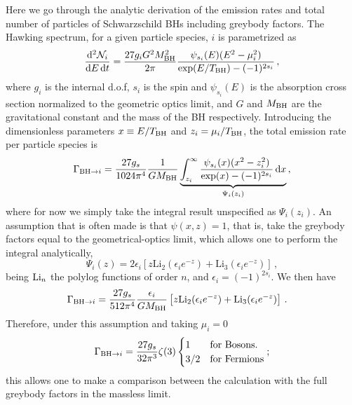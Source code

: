 \documentclass[aps,prd,reprint,twocolumn,preprintnumbers,floatfix,nofootinbib]{revtex4-1}
\newcommand{\TBH}{T_{\rm BH}}
\newcommand{\MBH}{M_{\rm BH}}
\begin{document}
Here we go through the analytic derivation of the emission rates and total number of particles of Schwarzschild BHs including greybody factors. The Hawking spectrum, for a given particle species, $i$ is parametrized as
\begin{equation}
    \frac{\dd[2]{\mathcal N_i}}{\dd{E}\dd{t}} = \frac{27g_i G^2\MBH^2}{2\pi}\frac{\psi_{s_i}(E)(E^2-\mu_i^2)}{\exp(E/\TBH)-(-1)^{2s_i}}\,,
\end{equation}
where $g_i$ is the internal d.o.f, $s_i$ is the spin and $\psi_{s_i}(E)$ is the absorption cross section normalized to the geometric optics limit, and $G$ and $\MBH$ are the gravitational constant and the mass of the BH respectively. Introducing the dimensionless parameters $x\equiv E/\TBH$ and $z_i=\mu_i/\TBH$, the total emission rate per particle species is
\begin{equation}\label{eq:GamSBH}
    \Gamma_{{\rm BH} \to i}=  \frac{27 g_s}{1024\pi^4}\frac{1}{G\MBH} \underbrace{\int_{z_i}^\infty \frac{\psi_{s_i}(x)(x^2-z_i^2)}{\exp(x)-(-1)^{2s_i}} \dd{x}}_{\Psi_i (z_i)}\,,
\end{equation}
where for now we simply take the integral result unspecified as $\Psi_i(z_i)$. An assumption that is often made is that $\psi(x,z)=1$, that is, take the greybody factors equal to the geometrical-optics limit, which allows one to perform the integral analytically, 
\begin{equation}
    \Psi_i (z)=2\epsilon_i\left[z\text{Li}_2(\epsilon_i e^{-z})+\text{Li}_3(\epsilon_i e^{-z})\right]\,,
\end{equation}
being ${\rm Li}_n$ the polylog functions of order $n$, and $\epsilon_i=(-1)^{2 s_i}$. We then have
\begin{align}
     \Gamma_{{\rm BH} \to i}
     &=\frac{27 g_s}{512\pi^4}\frac{\epsilon_i}{G\MBH}\left[z\text{Li}_2(\epsilon_i e^{-z})+\text{Li}_3(\epsilon_i e^{-z})\right]\,.
\end{align}
Therefore, under this assumption and taking $\mu_i=0$
\begin{equation}
    \Gamma_{{\rm BH} \to i}=\frac{27g_s}{32\pi^3}\zeta(3)\begin{cases}
    1 & \text{for Bosons}.\\
    3/2 & \text{for Fermions}
    \end{cases};
\end{equation}
this allows one to make a comparison between the calculation with the full greybody factors in the massless limit. 
\end{document}
